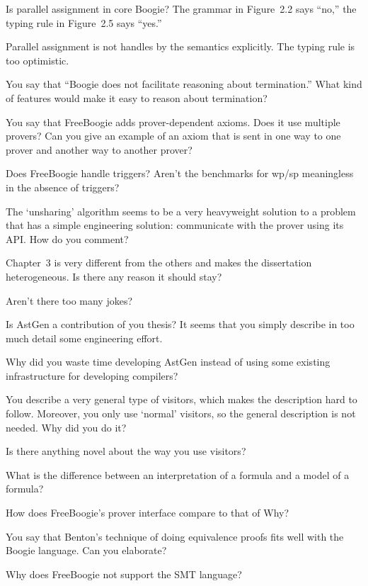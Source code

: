 \Q Is parallel assignment in core Boogie? The grammar in Figure~2.2 says
``no,'' the typing rule in Figure~2.5 says ``yes.''

\A Parallel assignment is not handles by the semantics explicitly. The
typing rule is too optimistic.

\Q You say that ``Boogie does not facilitate reasoning about termination.''
What kind of features would make it easy to reason about termination?

\Q You say that FreeBoogie adds prover-dependent axioms. Does it use
multiple provers? Can you give an example of an axiom that is sent in one
way to one prover and another way to another prover?

\Q Does FreeBoogie handle triggers? Aren't the benchmarks for wp/sp
meaningless in the absence of triggers?

\Q The `unsharing' algorithm seems to be a very heavyweight solution to a
problem that has a simple engineering solution: communicate with the prover
using its API. How do you comment?

\Q Chapter~3 is very different from the others and makes the dissertation
heterogeneous. Is there any reason it should stay?

\Q Aren't there too many jokes?

\Q Is AstGen a contribution of you thesis? It seems that you simply
describe in too much detail some engineering effort.


\Q Why did you waste time developing AstGen instead of using some existing
infrastructure for developing compilers?

\Q You describe a very general type of visitors, which makes the
description hard to follow. Moreover, you only use `normal' visitors, so
the general description is not needed. Why did you do it?

\Q Is there anything novel about the way you use visitors?

\Q What is the difference between an interpretation of a formula and a
model of a formula?

\Q How does FreeBoogie's prover interface compare to that of Why?

\Q You say that Benton's technique of doing equivalence proofs fits well
with the Boogie language. Can you elaborate?

\Q Why does FreeBoogie not support the SMT language?


